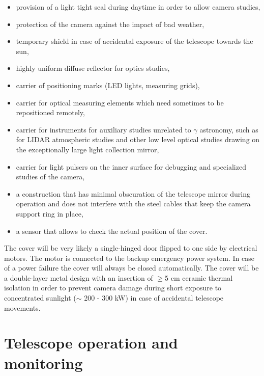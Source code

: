\begin{itemize}
\item  provision of a light tight seal during daytime in order to allow
camera studies,

\item  protection of the camera against the impact of bad weather,

\item  temporary shield in case of accidental exposure of the telescope
towards the sun,

\item  highly uniform diffuse reflector for optics studies,

\item  carrier of positioning marks (LED lights, measuring grids),

\item  carrier for optical measuring elements which need sometimes to be
repositioned remotely,

\item  carrier for instruments for auxiliary studies unrelated to $\gamma $
astronomy, such as for LIDAR atmospheric studies and other low level optical
studies drawing on the exceptionally large light collection mirror,

\item  carrier for light pulsers on the inner surface for debugging and
specialized studies of the camera,

\item  a construction that has minimal obscuration of the telescope mirror
during operation and does not interfere with the steel cables that keep the
camera support ring in place,

\item  a sensor that allows to check the actual position of the cover.
\end{itemize}

The cover will be very likely a single-hinged door flipped to one side by
electrical motors. The motor is connected to the backup emergency power
system. In case of a power failure the cover will always be closed
automatically. The cover will be a double-layer metal design with an
insertion of $\geq $5 cm ceramic thermal isolation in order to prevent
camera damage during short exposure to concentrated sunlight ($\sim $ 200 -
300 kW) in case of accidental telescope movements.

\section{Telescope operation and monitoring}
\label{sec-operation}

